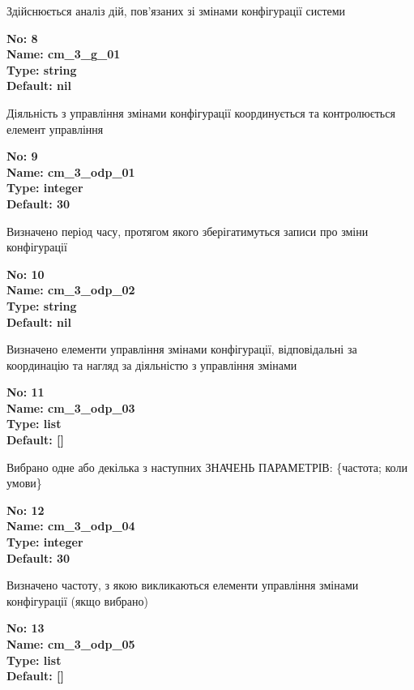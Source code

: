 \documentclass{article}
\begin{document}
{\footnotesize Здійснюється аналіз дій, пов'язаних зі змінами конфігурації системи}


{\footnotesize\bfseries
No: 8\\
Name: cm\_\allowbreak{}3\_\allowbreak{}g\_\allowbreak{}01\\
Type: string\\
Default: nil
}

{\footnotesize Діяльність з управління змінами конфігурації координується та контролюється елемент управління}


{\footnotesize\bfseries
No: 9\\
Name: cm\_\allowbreak{}3\_\allowbreak{}odp\_\allowbreak{}01\\
Type: integer\\
Default: 30
}

{\footnotesize Визначено період часу, протягом якого зберігатимуться записи про зміни конфігурації}


{\footnotesize\bfseries
No: 10\\
Name: cm\_\allowbreak{}3\_\allowbreak{}odp\_\allowbreak{}02\\
Type: string\\
Default: nil
}

{\footnotesize Визначено елементи управління змінами конфігурації, відповідальні за координацію та нагляд за діяльністю з управління змінами}


{\footnotesize\bfseries
No: 11\\
Name: cm\_\allowbreak{}3\_\allowbreak{}odp\_\allowbreak{}03\\
Type: list\\
Default: []
}

{\footnotesize Вибрано одне або декілька з наступних ЗНАЧЕНЬ ПАРАМЕТРІВ: \{частота; коли умови\}}


{\footnotesize\bfseries
No: 12\\
Name: cm\_\allowbreak{}3\_\allowbreak{}odp\_\allowbreak{}04\\
Type: integer\\
Default: 30
}

{\footnotesize Визначено частоту, з якою викликаються елементи управління змінами конфігурації (якщо вибрано)}


{\footnotesize\bfseries
No: 13\\
Name: cm\_\allowbreak{}3\_\allowbreak{}odp\_\allowbreak{}05\\
Type: list\\
Default: []
}
\end{document}
